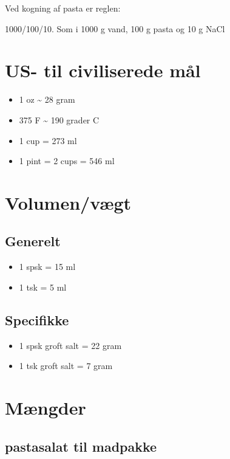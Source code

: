 \documentclass[
]{book}
\providecommand{\tightlist}{%
  \setlength{\itemsep}{0pt}\setlength{\parskip}{0pt}}
\begin{document}
Ved kogning af pasta er reglen:

1000/100/10. Som i 1000 g vand, 100 g pasta og 10 g NaCl

\section{US- til civiliserede mål}\label{us--til-civiliserede-muxe5l}

\begin{itemize}
\tightlist
\item
  1 oz \textasciitilde{} 28 gram
\item
  375 F \textasciitilde{} 190 grader C
\item
  1 cup = 273 ml
\item
  1 pint = 2 cups = 546 ml
\end{itemize}

\section{Volumen/vægt}\label{volumenvuxe6gt}

\subsection{Generelt}\label{generelt}

\begin{itemize}
\tightlist
\item
  1 spsk = 15 ml
\item
  1 tsk = 5 ml
\end{itemize}

\subsection{Specifikke}\label{specifikke}

\begin{itemize}
\tightlist
\item
  1 spsk groft salt = 22 gram
\item
  1 tsk groft salt = 7 gram
\end{itemize}

\section{Mængder}\label{muxe6ngder}

\subsection{pastasalat til madpakke}\label{pastasalat-til-madpakke}
\end{document}
